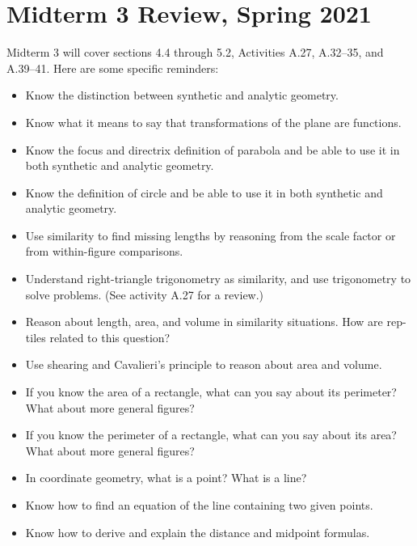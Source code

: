 \newpage

\section{Midterm 3 Review, Spring 2021}


Midterm 3 will cover sections 4.4 through 5.2, Activities A.27, A.32--35, and A.39--41. Here are some specific reminders:
\begin{itemize}\itemsep-3pt
\item Know the distinction between synthetic and analytic geometry.
\item Know what it means to say that transformations of the plane are functions.  
\item Know the focus and directrix definition of parabola and be able to use it in both synthetic and analytic geometry.
\item Know the definition of circle and be able to use it in both synthetic and analytic geometry.
\item Use similarity to find missing lengths by reasoning from the scale factor or from within-figure comparisons.   
\item Understand right-triangle trigonometry as similarity, and use trigonometry to solve problems.  (See activity A.27 for a review.)
\item Reason about length, area, and volume in similarity situations.  How are rep-tiles related to this question?  
\item Use shearing and Cavalieri's principle to reason about area and volume.  
\item If you know the area of a rectangle, what can you say about its perimeter?  What about more general figures?  
\item If you know the perimeter of a rectangle, what can you say about its area?  What about more general figures? 
\item In coordinate geometry, what is a point?  What is a line?  
\item Know how to find an equation of the line containing two given points.  
\item Know how to derive and explain the distance and midpoint formulas. 
\end{itemize}


